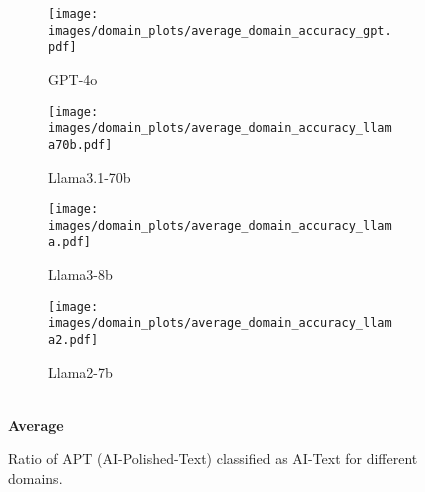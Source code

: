 \begin{figure*}[htbp]
    \vspace{0.5cm} %
    \begin{minipage}{\textwidth}
    \centering
        \begin{subfigure}{0.24\textwidth}
            \centering
            \texttt{[image: images/domain\_plots/average\_domain\_accuracy\_gpt.pdf]}
            \caption{GPT-4o}
        \end{subfigure}
        \hfill
        \begin{subfigure}{0.24\textwidth}
            \centering
            \texttt{[image: images/domain\_plots/average\_domain\_accuracy\_llama70b.pdf]}
            \caption{Llama3.1-70b}
        \end{subfigure}
        \hfill
        \begin{subfigure}{0.24\textwidth}
            \centering
            \texttt{[image: images/domain\_plots/average\_domain\_accuracy\_llama.pdf]}
            \caption{Llama3-8b}
        \end{subfigure}
        \hfill
        \begin{subfigure}{0.24\textwidth}
            \centering
            \texttt{[image: images/domain\_plots/average\_domain\_accuracy\_llama2.pdf]}
            \caption{Llama2-7b}
        \end{subfigure}
        \\ %
        \vspace{0.2cm}
        \small \textbf{Average}
    \end{minipage}
    
    \caption{Ratio of APT (AI-Polished-Text) classified as AI-Text for different domains.}
    \label{fig:domain_all_results}
\end{figure*}






